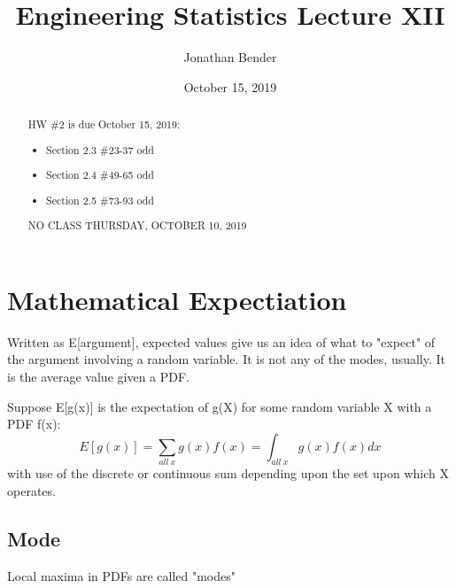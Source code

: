 \documentclass[]{article}
\title{Engineering Statistics Lecture XII}
\author{Jonathan Bender}
\date{October 15, 2019}
\begin{document}
	
	\maketitle
	
	\begin{abstract}	
		HW \#2 is due October 15, 2019:
		\begin{itemize}
			\item Section 2.3 \#23-37 odd
			\item Section 2.4 \#49-65 odd
			\item Section 2.5 \#73-93 odd
		\end{itemize}
	
		NO CLASS THURSDAY, OCTOBER 10, 2019
	\end{abstract}

	\section{Mathematical Expectiation}
		Written as E[argument], expected values give us an idea of what to "expect" of the argument involving a random variable. It is not any of the modes, usually. It is the average value given a PDF.
		
		Suppose E[g(x)] is the expectation of g(X) for some random variable X with a PDF f(x):
		$$E[g(x)]=\sum_{all\ x}g(x)f(x)=\int_{all\ x}g(x)f(x)dx$$
		with use of the discrete or continuous sum depending upon the set upon which X operates.
		
		\subsection{Mode}
			Local maxima in PDFs are called "modes"
	
\end{document}
